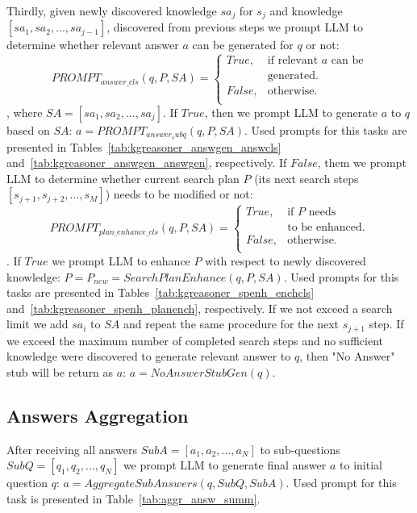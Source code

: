 Thirdly, given newly discovered knowledge $sa_j$ for $s_j$ and knowledge $[sa_1, sa_2, ..., sa_{j-1}]$, discovered from previous steps we prompt LLM to determine whether relevant answer $a$ can be generated for $q$ or not: 
\[
PROMPT_{answer\_cls}(q, P, SA) = \left\{ \begin{array}{rl}
True, & \text{if relevant $a$ can be} \\ & \text{generated}. \\ 
False, & \text{otherwise}. \\ 
\end{array}\right.
\], where $SA = [sa_1, sa_2, ..., sa_j]$. If $True$, then we prompt LLM to generate $a$ to $q$ based on $SA$: $a = PROMPT_{answer_subq}(q, P, SA)$. Used prompts for this tasks are presented in Tables~\ref{tab:kgreasoner_answgen_answcls} and~\ref{tab:kgreasoner_answgen_answgen}, respectively. If $False$, them we prompt LLM to determine whether current search plan $P$ (its next search steps $[s_{j+1}, s_{j+2}, ..., s_M]$) needs to be modified or not: 
\[
PROMPT_{plan\_enhance\_cls}(q, P, SA) = \left\{ \begin{array}{rl}
True, & \text{if $P$ needs} \\ & \text{to be enhanced}. \\ 
False, & \text{otherwise}. \\ 
\end{array}\right.
\]. If $True$ we prompt LLM to enhance $P$ with respect to newly discovered knowledge: $P = P_{new} = SearchPlanEnhance(q, P, SA)$. Used prompts for this tasks are presented in Tables~\ref{tab:kgreasoner_spenh_enchcls} and~\ref{tab:kgreasoner_spenh_planench}, respectively. If we not exceed a search limit we add $sa_i$ to $SA$ and repeat the same procedure for the next $s_{j+1}$ step. If we exceed the maximum number of completed search steps and no sufficient knowledge were discovered to generate relevant answer to $q$, then "No Answer" stub will be return as $a$: $a = NoAnswerStubGen(q)$.

\subsection{Answers Aggregation}

After receiving all answers $SubA = [a_1, a_2, ...,a_N]$ to sub-questions $SubQ = [q_1, q_2, ..., q_N]$ we prompt LLM to generate final answer $a$ to initial question $q$: $a = AggregateSubAnswers(q, SubQ, SubA)$. Used prompt for this task is presented in Table~\ref{tab:aggr_answ_summ}.


